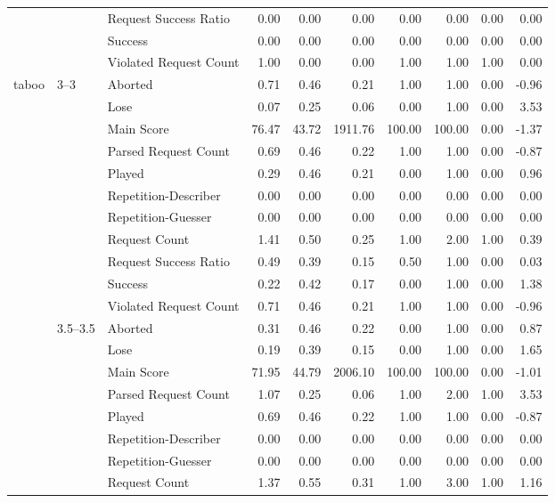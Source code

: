 \begin{tabular}{lllrrrrrrr}
 &  & Request Success Ratio & 0.00 & 0.00 & 0.00 & 0.00 & 0.00 & 0.00 & 0.00 \\
 &  & Success & 0.00 & 0.00 & 0.00 & 0.00 & 0.00 & 0.00 & 0.00 \\
 &  & Violated Request Count & 1.00 & 0.00 & 0.00 & 1.00 & 1.00 & 1.00 & 0.00 \\
\cline{1-10} \cline{2-10}
\multirow[t]{121}{*}{taboo} & \multirow[t]{11}{*}{3--3} & Aborted & 0.71 & 0.46 & 0.21 & 1.00 & 1.00 & 0.00 & -0.96 \\
 &  & Lose & 0.07 & 0.25 & 0.06 & 0.00 & 1.00 & 0.00 & 3.53 \\
 &  & Main Score & 76.47 & 43.72 & 1911.76 & 100.00 & 100.00 & 0.00 & -1.37 \\
 &  & Parsed Request Count & 0.69 & 0.46 & 0.22 & 1.00 & 1.00 & 0.00 & -0.87 \\
 &  & Played & 0.29 & 0.46 & 0.21 & 0.00 & 1.00 & 0.00 & 0.96 \\
 &  & Repetition-Describer & 0.00 & 0.00 & 0.00 & 0.00 & 0.00 & 0.00 & 0.00 \\
 &  & Repetition-Guesser & 0.00 & 0.00 & 0.00 & 0.00 & 0.00 & 0.00 & 0.00 \\
 &  & Request Count & 1.41 & 0.50 & 0.25 & 1.00 & 2.00 & 1.00 & 0.39 \\
 &  & Request Success Ratio & 0.49 & 0.39 & 0.15 & 0.50 & 1.00 & 0.00 & 0.03 \\
 &  & Success & 0.22 & 0.42 & 0.17 & 0.00 & 1.00 & 0.00 & 1.38 \\
 &  & Violated Request Count & 0.71 & 0.46 & 0.21 & 1.00 & 1.00 & 0.00 & -0.96 \\
\cline{2-10}
 & \multirow[t]{11}{*}{3.5--3.5} & Aborted & 0.31 & 0.46 & 0.22 & 0.00 & 1.00 & 0.00 & 0.87 \\
 &  & Lose & 0.19 & 0.39 & 0.15 & 0.00 & 1.00 & 0.00 & 1.65 \\
 &  & Main Score & 71.95 & 44.79 & 2006.10 & 100.00 & 100.00 & 0.00 & -1.01 \\
 &  & Parsed Request Count & 1.07 & 0.25 & 0.06 & 1.00 & 2.00 & 1.00 & 3.53 \\
 &  & Played & 0.69 & 0.46 & 0.22 & 1.00 & 1.00 & 0.00 & -0.87 \\
 &  & Repetition-Describer & 0.00 & 0.00 & 0.00 & 0.00 & 0.00 & 0.00 & 0.00 \\
 &  & Repetition-Guesser & 0.00 & 0.00 & 0.00 & 0.00 & 0.00 & 0.00 & 0.00 \\
 &  & Request Count & 1.37 & 0.55 & 0.31 & 1.00 & 3.00 & 1.00 & 1.16 \\

\end{tabular}

